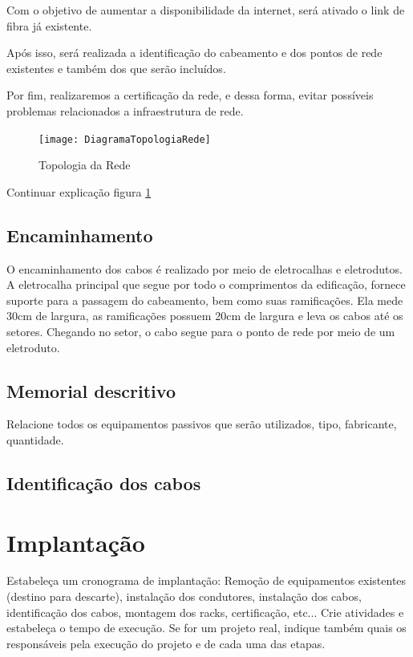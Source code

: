 \documentclass[	DIV=calc,%
							paper=a4,%
							fontsize=12pt,%
							onecolumn]{scrartcl}	 					%
\begin{document}
Com o objetivo de aumentar a disponibilidade da internet, será ativado o link de fibra já existente.

Após isso, será realizada a identificação do cabeamento e dos pontos de rede existentes e também dos que serão incluídos.

Por fim, realizaremos a certificação da rede, e dessa forma, evitar possíveis problemas relacionados a infraestrutura de rede.





\begin{figure}[h!]
	\centering
	\texttt{[image: DiagramaTopologiaRede]}
	\caption{Topologia da Rede}
	\label{DiagramaTopologiaRede}
\end{figure}


Continuar explicação figura \ref{DiagramaTopologiaRede}

\subsection{Encaminhamento}



O encaminhamento dos cabos é realizado por meio de eletrocalhas e eletrodutos. A eletrocalha principal que segue por todo o comprimentos da edificação, fornece suporte para a passagem do cabeamento, bem como suas ramificações. Ela mede 30cm de largura, as ramificações possuem 20cm de largura e leva os cabos até os setores. Chegando no setor, o cabo segue para o ponto de rede por meio de um eletroduto.




\subsection{Memorial descritivo}

Relacione todos os equipamentos passivos que serão utilizados, tipo, fabricante, quantidade.

\subsection{Identificação dos cabos}

\section{Implantação}
Estabeleça um cronograma de implantação:
Remoção de equipamentos existentes (destino para descarte), instalação dos condutores, instalação dos cabos, 
identificação dos cabos, montagem dos racks, certificação, etc... Crie atividades e estabeleça o tempo de execução. Se for um projeto real, indique também quais os responsáveis pela execução do projeto e de cada uma das etapas.
\end{document}
